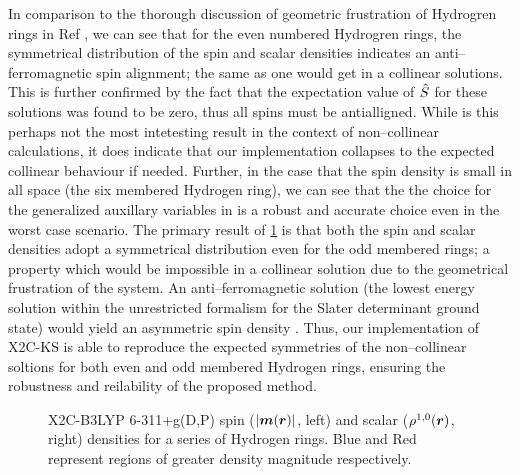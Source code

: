 In comparison to the thorough discussion of geometric frustration of Hydrogren rings in Ref \cite{Li15_154109}, 
we can see that for the even numbered Hydrogren rings,
the symmetrical distribution of the spin and scalar densities indicates an anti--ferromagnetic spin
alignment; the same as one would get in a collinear solutions. This is further confirmed by the fact that
the expectation value of $\hat{S}$ for these solutions was found to be zero, thus all spins must be antialligned.
While is this perhaps not the most
intetesting result in the context of non--collinear calculations, it does indicate that our implementation
collapses to the expected collinear behaviour if needed. Further, in the case that the spin density is small
in all space (the six membered Hydrogen ring), we can see that the the choice for the generalized auxillary
variables in  is a robust and accurate choice even in the worst case scenario.
The primary result of \cref{fig:rings} is that both the spin and scalar densities adopt a symmetrical
distribution even for the odd membered rings; a property which would be impossible in a collinear solution
due to the geometrical frustration of the system. An anti--ferromagnetic solution (the lowest energy
solution within the unrestricted formalism for the Slater determinant ground state) would yield an
asymmetric spin density \cite{Li15_154109}. Thus, our implementation of X2C-KS is able to reproduce the expected symmetries of
the non--collinear soltions for both even and odd membered Hydrogen rings, ensuring the robustness and 
reilability of the proposed method.





\begin{figure}
\begin{center}
\end{center}
\caption{X2C-B3LYP  6-311+g(D,P) spin ($\vert \boldsymbol{m}(\boldsymbol{r})\vert$, left) and scalar ($\rho^{1,0}(\boldsymbol{r})$, right) densities for a series of Hydrogen rings.
Blue and Red represent regions of greater density magnitude respectively.}
\label{fig:rings}       
\end{figure}

